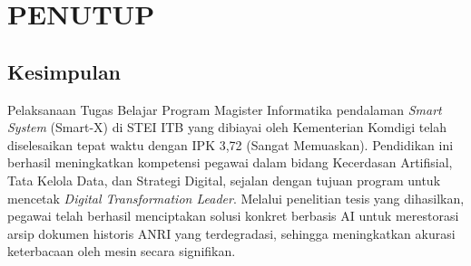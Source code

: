 \documentclass[11pt, a4paper]{article}
\begin{document}
\vspace{0.5cm}

\section{PENUTUP}

\subsection{Kesimpulan}
Pelaksanaan Tugas Belajar Program Magister Informatika pendalaman \textit{Smart System} (Smart-X) di STEI ITB yang dibiayai oleh Kementerian Komdigi telah diselesaikan tepat waktu dengan IPK 3,72 (Sangat Memuaskan). Pendidikan ini berhasil meningkatkan kompetensi pegawai dalam bidang Kecerdasan Artifisial, Tata Kelola Data, dan Strategi Digital, sejalan dengan tujuan program untuk mencetak \textit{Digital Transformation Leader}. Melalui penelitian tesis yang dihasilkan, pegawai telah berhasil menciptakan solusi konkret berbasis AI untuk merestorasi arsip dokumen historis ANRI yang terdegradasi, sehingga meningkatkan akurasi keterbacaan oleh mesin secara signifikan.
\end{document}
